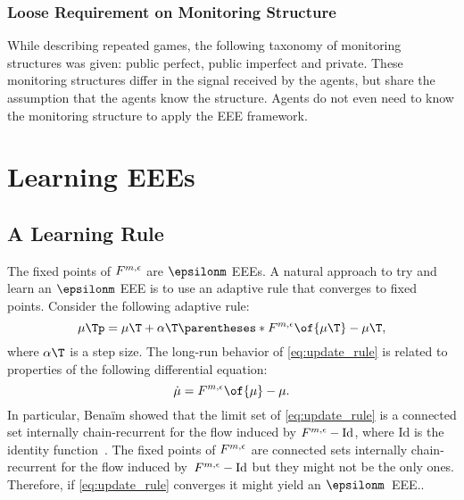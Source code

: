 \subsubsection{Loose Requirement on Monitoring Structure}
While describing repeated games, the following taxonomy of monitoring structures was given: public perfect, public imperfect and private.
These monitoring structures differ in the signal received by the agents, but share the assumption that the agents know the structure.
Agents do not even need to know the monitoring structure to apply the EEE framework.


\section{Learning EEEs}
\label{sec:learning_eees}


\subsection{A Learning Rule}

The fixed points of \(F^{m, \epsilon}\) are \(\epsilonm\) EEEs.
A natural approach to try and learn an \(\epsilonm\) EEE is to use an adaptive rule that converges to fixed points.
Consider the following adaptive rule:
\begin{equation}
\label{eq:update_rule}
\mu\Tp = \mu\T + \alpha\T \parentheses*{\FF \of{\mu\T} - \mu\T},
\end{equation}
where \(\alpha\T\) is a step size.
The long-run behavior of \cref{eq:update_rule} is related to properties of the following differential equation:
\begin{equation*}
\label{eq:differential_equation}
\dot{\mu} = \FF \of{\mu} - \mu.
\end{equation*}
In particular, Benaïm showed that the limit set of \cref{eq:update_rule} is a connected set internally chain-recurrent for the flow induced by \(F^{m, \epsilon} - \text{Id}\), where \(\text{Id}\) is the identity function~\cite{benaim:1996}.
The fixed points of \(F^{m, \epsilon}\) are connected sets internally chain-recurrent for the flow induced by~\(F^{m, \epsilon} - \text{Id}\) but they might not be the only ones.
Therefore, if \cref{eq:update_rule} converges it might yield an \(\epsilonm\)~EEE..


